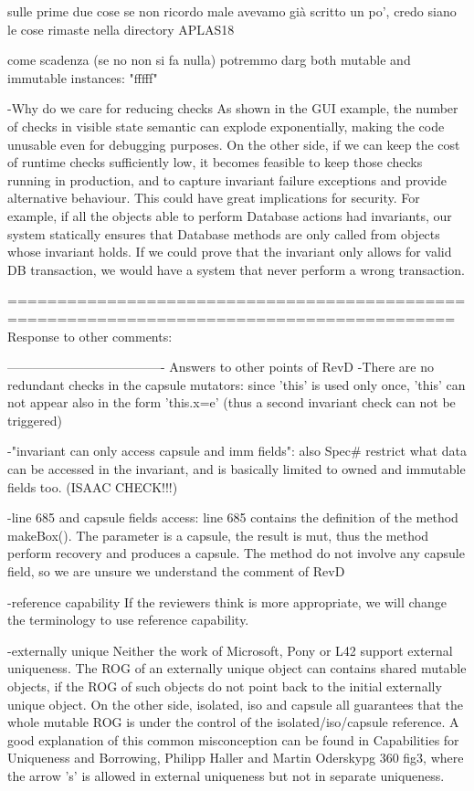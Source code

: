 sulle prime due cose se non ricordo male avevamo già scritto un po', credo siano le cose rimaste nella directory APLAS18

come scadenza (se no non si fa nulla) potremmo darg both mutable and immutable instances: "fffff"

-Why do we care for reducing checks
As shown in the GUI example, the number of checks in visible state semantic can explode
exponentially, making the code unusable even for debugging purposes.
On the other side, if we can keep the cost of runtime checks sufficiently low,
it becomes feasible to keep those checks running in production,
and to capture invariant failure exceptions and provide alternative behaviour.
This could have great implications for security.
For example, if all the objects able to perform Database actions had invariants,
our system statically ensures that Database methods are only called from objects whose invariant holds.
If we could prove that the invariant only allows for valid DB transaction, we would have a system
that never perform a wrong transaction.

===========================================================================================
Response to other comments:

-------------------------------------
Answers to other points of RevD
-There are no redundant checks in the capsule mutators: since 'this' is used only once,
 'this' can not appear also in the form 'this.x=e' (thus a second invariant check can not be triggered)

-"invariant can only access capsule and imm fields":
also Spec# restrict what data can be accessed in the invariant, and is basically limited
to owned and immutable fields too. (ISAAC CHECK!!!)

-line 685 and capsule fields access:
line 685 contains the definition of the method makeBox().
The parameter is a capsule, the result is mut, thus the method perform recovery and produces a capsule.
The method do not involve any capsule field, so we are unsure we understand the comment of RevD

-reference capability 
  If the reviewers think is more appropriate, we will change the terminology to use reference capability.

-externally unique
Neither the work of Microsoft, Pony or L42 support external uniqueness.
The ROG of an externally unique object can contains shared mutable objects,
if the ROG of such objects do not point back to the initial externally unique object.
On the other side, isolated, iso and capsule all guarantees that the whole mutable ROG
is under the control of the isolated/iso/capsule reference.
A good explanation of this common misconception can be found in
Capabilities for Uniqueness and Borrowing, Philipp Haller and Martin Oderskypg 360 fig3,
where the arrow 's' is allowed in external uniqueness but not in separate uniqueness.

